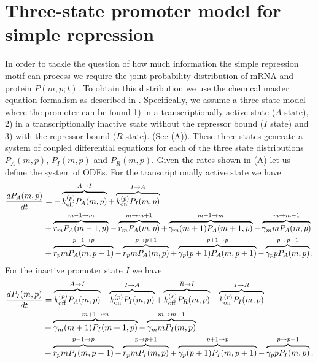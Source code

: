 \section{Three-state promoter model for simple repression}\label{supp_model}

In order to tackle the question of how much information the simple repression
motif can process we require the joint probability distribution of mRNA and
protein $P(m, p; t)$. To obtain this distribution we use the chemical master
equation formalism as described in . Specifically, we assume
a three-state model where the promoter can be found 1) in a transcriptionally
active state  ($A$ state), 2) in a transcriptionally inactive state without the
repressor bound ($I$ state) and 3) with the repressor bound ($R$ state). (See
(A)). These three states generate a system of coupled
differential equations for each of the three state distributions $P_A(m, p)$,
$P_I(m, p)$ and $P_R(m, p)$. Given the rates shown in
(A) let us define the system of ODEs. For the
transcriptionally active state we have
\begin{equation}
  \begin{aligned}
    \dt{P_A(m, p)} &=
    - \overbrace{\kpoff P_A(m, p)}^{A \rightarrow I} %
    + \overbrace{\kpon P_I(m, p)}^{I \rightarrow A}\\ %
    &+ \overbrace{r_m P_A(m-1, p)}^{m-1 \rightarrow m} %
    - \overbrace{r_m P_A(m, p)}^{m \rightarrow m+1}%
    + \overbrace{\gm (m + 1) P_A(m+1 , p)}^{m+1 \rightarrow m} %
    - \overbrace{\gm m P_A(m , p)}^{m \rightarrow m-1}\\ %
    &+ \overbrace{r_p m P_A(m, p - 1)}^{p-1 \rightarrow p} %
    - \overbrace{r_p m P_A(m, p)}^{p \rightarrow p+1} %
    + \overbrace{\gp (p + 1) P_A(m, p + 1)}^{p + 1 \rightarrow p} %
    - \overbrace{\gp p P_A(m, p)}^{p \rightarrow p-1}. %
  \end{aligned}
\end{equation}
For the inactive promoter state $I$ we have
\begin{equation}
  \begin{aligned}
    \dt{P_I(m, p)} &=
    \overbrace{\kpoff P_A(m, p)}^{A \rightarrow I} %
    - \overbrace{\kpon P_I(m, p)}^{I \rightarrow A} %
    + \overbrace{\kroff P_R(m, p)}^{R \rightarrow I} %
    - \overbrace{\kron P_I(m, p)}^{I \rightarrow R}\\ %
    &+ \overbrace{\gm (m + 1) P_I(m+1 , p)}^{m+1 \rightarrow m} %
    - \overbrace{\gm m P_I(m , p)}^{m \rightarrow m-1}\\ %
    &+ \overbrace{r_p m P_I(m, p - 1)}^{p-1 \rightarrow p} %
    - \overbrace{r_p m P_I(m, p)}^{p \rightarrow p+1} %
    + \overbrace{\gp (p + 1) P_I(m, p + 1)}^{p + 1 \rightarrow p} %
    - \overbrace{\gp p P_I(m, p)}^{p \rightarrow p-1}. %
  \end{aligned}
\end{equation}
